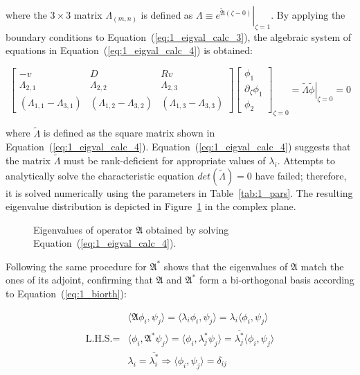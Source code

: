 where the $ 3 \times 3$ matrix $\Lambda_{(m,n)}$ is defined as $\Lambda \equiv \left. e^{\tilde{\mathfrak{A}} (\zeta - 0)} \right|_{\zeta = 1}$. By applying the boundary conditions to Equation~(\ref{eq:1_eigval_calc_3}), the algebraic system of equations in Equation~(\ref{eq:1_eigval_calc_4}) is obtained:

\begin{equation} \label{eq:1_eigval_calc_4}
    \begin{bmatrix}
        -v & D & Rv \\
        \Lambda_{2,1} & \Lambda_{2,2} & \Lambda_{2,3} \\
        (\Lambda_{1,1} - \Lambda_{3,1}) & (\Lambda_{1,2} - \Lambda_{3,2}) & (\Lambda_{1,3} - \Lambda_{3,3})
    \end{bmatrix} \begin{bmatrix}
        \phi_1 \\ \partial_\zeta \phi_1 \\ \phi_2
    \end{bmatrix}_{\zeta=0} = \tilde{\Lambda} \left. \tilde{{\phi}} \right|_{\zeta = 0} = 0
\end{equation}

where $\tilde{\Lambda}$ is defined as the square matrix shown in Equation~(\ref{eq:1_eigval_calc_4}). Equation~(\ref{eq:1_eigval_calc_4}) suggests that the matrix $\tilde{\Lambda}$ must be rank-deficient for appropriate values of $\lambda_i$. Attempts to analytically solve the characteristic equation $det(\tilde{\Lambda}) = 0$ have failed; therefore, it is solved numerically using the parameters in Table~\ref{tab:1_pars}. The resulting eigenvalue distribution is depicted in Figure~\ref{fig:1_eigval_dist} in the complex plane.

\begin{figure}[!htbp]
    \centering
    
    \caption{Eigenvalues of operator $\mathfrak{A}$ obtained by solving Equation~(\ref{eq:1_eigval_calc_4}).}
    \label{fig:1_eigval_dist}
\end{figure}

Following the same procedure for $\mathfrak{A}^*$ shows that the eigenvalues of $\mathfrak{A}$ match the ones of its adjoint, confirming that $\mathfrak{A}$ and $\mathfrak{A}^*$ form a bi-orthogonal basis according to Equation~(\ref{eq:1_biorth}):

\begin{equation} \label{eq:1_biorth}
    \begin{aligned}
        &\langle \mathfrak{A} {\phi_i}, {\psi_j} \rangle = \langle \lambda_i {\phi_i}, {\psi_j} \rangle = \lambda_i \langle {\phi_i}, {\psi_j} \rangle \\
        \text{L.H.S.} = &\langle {\phi_i}, \mathfrak{A}^* {\psi_j} \rangle = \langle {\phi_i}, \lambda_j^* {\psi_j} \rangle = \overline{\lambda_j^*} \langle {\phi_i}, {\psi_j} \rangle \\
        &\lambda_i = \overline{\lambda_i^*} \Rightarrow \langle {\phi_i}, {\psi_j} \rangle = \delta_{ij}
    \end{aligned}
\end{equation}

